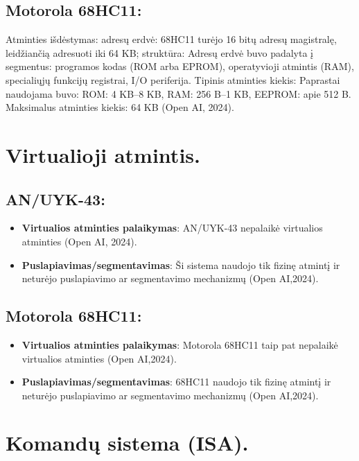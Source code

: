 \documentclass[a4paper,12pt]{article}
\begin{document}
\subsection{Motorola 68HC11:}
Atminties išdėstymas: adresų erdvė: 68HC11 turėjo 16 bitų adresų magistralę, leidžiančią adresuoti iki 64 KB; struktūra: Adresų erdvė buvo padalyta į segmentus: programos kodas (ROM arba EPROM), operatyvioji atmintis (RAM), specialiųjų funkcijų registrai, I/O periferija.
Tipinis atminties kiekis: Paprastai naudojama buvo: ROM: 4 KB–8 KB, RAM: 256 B–1 KB, EEPROM: apie 512 B. Maksimalus atminties kiekis: 64 KB (Open AI, 2024).

\section{Virtualioji atmintis.}
\subsection{AN/UYK-43:}
\begin{itemize}
    \item \textbf{Virtualios atminties palaikymas}: AN/UYK-43 nepalaikė virtualios atminties (Open AI, 2024).
    \item \textbf{Puslapiavimas/segmentavimas}: Ši sistema naudojo tik fizinę atmintį ir neturėjo puslapiavimo ar segmentavimo mechanizmų (Open AI,2024).
\end{itemize}
\subsection{Motorola 68HC11:}
\begin{itemize}
    \item \textbf{Virtualios atminties palaikymas}: Motorola 68HC11 taip pat nepalaikė virtualios atminties (Open AI,2024).
    \item \textbf{Puslapiavimas/segmentavimas}: 68HC11 naudojo tik fizinę atmintį ir neturėjo puslapiavimo ar segmentavimo mechanizmų (Open AI,2024).
\end{itemize}

\section{Komandų sistema (ISA).}
\end{document}
